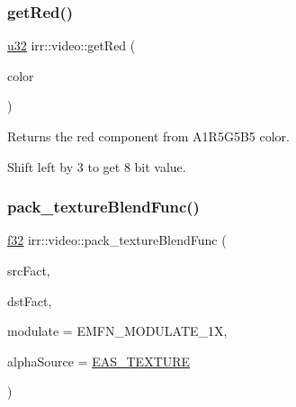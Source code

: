 \subsubsection{\texorpdfstring{get\+Red()}{getRed()}}
{\footnotesize\ttfamily \hyperlink{namespaceirr_a0416a53257075833e7002efd0a18e804}{u32} irr\+::video\+::get\+Red (\begin{DoxyParamCaption}\item[{\hyperlink{namespaceirr_ae9f8ec82692ad3b83c21f555bfa70bcc}{u16}}]{color }\end{DoxyParamCaption})\hspace{0.3cm}{\ttfamily [inline]}}



Returns the red component from A1\+R5\+G5\+B5 color. 

Shift left by 3 to get 8 bit value. \mbox{\label{namespaceirr_1_1video_ad4d715752a69b052e582b06283513e49}} 
\subsubsection{\texorpdfstring{pack\+\_\+texture\+Blend\+Func()}{pack\_textureBlendFunc()}}
{\footnotesize\ttfamily \hyperlink{namespaceirr_a0277be98d67dc26ff93b1a6a1d086b07}{f32} irr\+::video\+::pack\+\_\+texture\+Blend\+Func (\begin{DoxyParamCaption}\item[{const \hyperlink{namespaceirr_1_1video_acae10401850a6cfd5fcf1548c6c884bc}{E\+\_\+\+B\+L\+E\+N\+D\+\_\+\+F\+A\+C\+T\+OR}}]{src\+Fact,  }\item[{const \hyperlink{namespaceirr_1_1video_acae10401850a6cfd5fcf1548c6c884bc}{E\+\_\+\+B\+L\+E\+N\+D\+\_\+\+F\+A\+C\+T\+OR}}]{dst\+Fact,  }\item[{const \hyperlink{namespaceirr_1_1video_a1402e9045137ae232fafbdf385800843}{E\+\_\+\+M\+O\+D\+U\+L\+A\+T\+E\+\_\+\+F\+U\+NC}}]{modulate = {\ttfamily EMFN\+\_\+MODULATE\+\_\+1X},  }\item[{const \hyperlink{namespaceirr_a0416a53257075833e7002efd0a18e804}{u32}}]{alpha\+Source = {\ttfamily \hyperlink{namespaceirr_1_1video_a08b237bb445ffc0f32932c8ed87c6e63a35d0c453dc4c35afcace2074f44eb551}{E\+A\+S\+\_\+\+T\+E\+X\+T\+U\+RE}} }\end{DoxyParamCaption})\hspace{0.3cm}{\ttfamily [inline]}}



